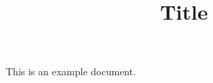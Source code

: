 \documentclass[11pt, letterpaper]{article}
\title{Title}
\begin{document}
\clearpage
\maketitle
This is an example document. \cite{lee2001nmf}
\printbibliography
\end{document}

